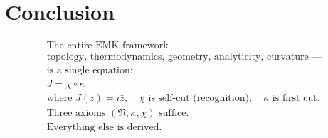 \documentclass[12pt]{article}
\begin{document}
\section{Conclusion}

\[
\boxed{
\begin{array}{c}
\text{The entire EMK framework —} \\
\text{topology, thermodynamics, geometry, analyticity, curvature —} \\
\text{is a single equation:} \\
J = \chi \circ \kappa \\
\text{where } J(z) = i\bar{z},\quad \chi \text{ is self-cut (recognition)},\quad \kappa \text{ is first cut}. \\
\text{Three axioms } (\mathfrak N, \kappa, \chi) \text{ suffice.} \\
\text{Everything else is derived.}
\end{array}
}
\]

\begin{center}
\end{center}
\end{document}
